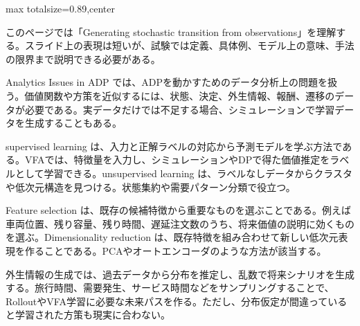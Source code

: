 \begin{minipage}[t]{0.58\textwidth}
\begin{adjustbox}{max totalsize={\textwidth}{0.89\textheight},center}
\begin{minipage}{\textwidth}\scriptsize
{}このページでは「Generating stochastic transition from observations」を理解する。スライド上の表現は短いが、試験では定義、具体例、モデル上の意味、手法の限界まで説明できる必要がある。\par
Analytics Issues in ADP では、ADPを動かすためのデータ分析上の問題を扱う。価値関数や方策を近似するには、状態、決定、外生情報、報酬、遷移のデータが必要である。実データだけでは不足する場合、シミュレーションで学習データを生成することもある。\par
supervised learning は、入力と正解ラベルの対応から予測モデルを学ぶ方法である。VFAでは、特徴量を入力し、シミュレーションやDPで得た価値推定をラベルとして学習できる。unsupervised learning は、ラベルなしデータからクラスタや低次元構造を見つける。状態集約や需要パターン分類で役立つ。\par
Feature selection は、既存の候補特徴から重要なものを選ぶことである。例えば車両位置、残り容量、残り時間、遅延注文数のうち、将来価値の説明に効くものを選ぶ。Dimensionality reduction は、既存特徴を組み合わせて新しい低次元表現を作ることである。PCAやオートエンコーダのような方法が該当する。\par
外生情報の生成では、過去データから分布を推定し、乱数で将来シナリオを生成する。旅行時間、需要発生、サービス時間などをサンプリングすることで、RolloutやVFA学習に必要な未来パスを作る。ただし、分布仮定が間違っていると学習された方策も現実に合わない。\par

\end{minipage}
\end{adjustbox}
\end{minipage}
